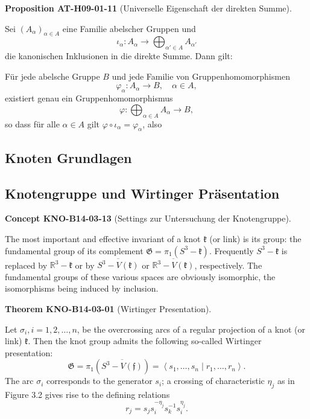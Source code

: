\documentclass[10pt, letterpaper]{article}
\newcommand{\CustomHeading}[3]{%
  \par\medskip\noindent%
  \textbf{#1 #2} \textnormal{(#3)}.\enskip%
}
\newenvironment{PROP}[2]{\CustomHeading{Proposition}{#1}{#2}}{}
\newenvironment{THEO}[2]{\CustomHeading{Theorem}{#1}{#2}}{}
\newenvironment{CONC}[2]{\CustomHeading{Concept}{#1}{#2}}{}
\begin{document}
\begin{PROP}{AT-H09-01-11}{Universelle Eigenschaft der direkten Summe}
Sei $(A_\alpha)_{\alpha \in A}$ eine Familie abelscher Gruppen und
\[
\iota_\alpha : A_\alpha \rightarrow \bigoplus_{\alpha' \in A} A_{\alpha'}
\]
die kanonischen Inklusionen in die direkte Summe. Dann gilt:

Für jede abelsche Gruppe $B$ und jede Familie von Gruppenhomomorphismen
\[
\varphi_\alpha : A_\alpha \rightarrow B, \quad \alpha \in A,
\]
existiert genau ein Gruppenhomomorphismus
\[
\varphi : \bigoplus_{\alpha \in A} A_\alpha \rightarrow B,
\]
so dass für alle $\alpha \in A$ gilt $\varphi \circ \iota_\alpha = \varphi_\alpha$, also
\begin{center}
\end{center}
\end{PROP}

\subsection{Knoten Grundlagen}

\subsection{Knotengruppe und Wirtinger Präsentation}

\begin{CONC}{KNO-B14-03-13}{Settings zur Untersuchung der Knotengruppe}
The most important and effective invariant of a knot $\mathfrak{k}$ (or link) is its group: the fundamental group of its complement $\mathfrak{G}=\pi_{1}\left(S^{3}-\mathfrak{k}\right)$. Frequently $S^{3}-\mathfrak{k}$ is replaced by $\mathbb{R}^{3}-\mathfrak{k}$ or by $\overline{S^{3}-V(\mathfrak{k})}$ or $\overline{\mathbb{R}^{3}-V(\mathfrak{k})}$, respectively. The fundamental groups of these various spaces are obviously isomorphic, the isomorphisms being induced by inclusion.
\end{CONC}

\begin{THEO}{KNO-B14-03-01}{Wirtinger Presentation}
Let $\sigma_{i}, i=1,2, \ldots, n$, be the overcrossing arcs of a regular projection of a knot (or link) $\mathfrak{k}$. Then the knot group admits the following so-called Wirtinger presentation:
$$
\mathfrak{G}=\pi_{1}\left(\overline{S^{3}-V(\mathfrak{f})}\right)=\left\langle s_{1}, \ldots, s_{n} \mid r_{1}, \ldots, r_{n}\right\rangle .
$$
The arc $\sigma_{i}$ corresponds to the generator $s_{i}$; a crossing of characteristic $\eta_{j}$ as in Figure 3.2 gives rise to the defining relations
$$
r_{j}=s_{j} s_{i}^{-\eta_{j}} s_{k}^{-1} s_{i}^{\eta_{j}} .
$$
\end{THEO}
\end{document}
